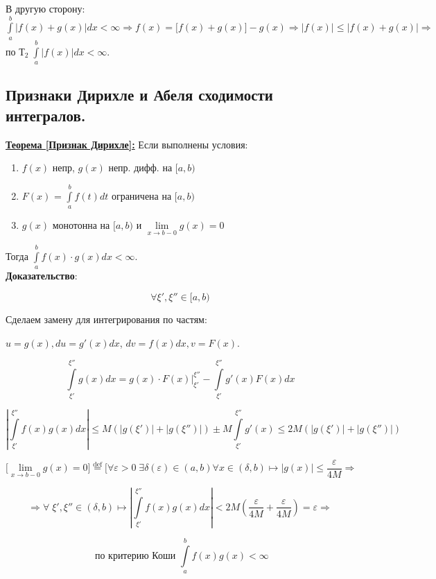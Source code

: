 \documentclass[a4paper,12pt]{article} %
\begin{document}
В другую сторону: $\int\limits_a^b |f(x) +g(x)| dx < \infty \Rightarrow f(x) = \bigl[f(x) + g(x) \bigr]-g(x) \Rightarrow |f(x)| \leq |f(x) + g(x)| \Rightarrow $ по $Т_2\; \int\limits_a^b |f(x)| dx < \infty$.\\


\subsection{Признаки Дирихле и Абеля сходимости интегралов.}

\underline{\textbf{Теорема [Признак Дирихле]:}} Если выполнены условия:

\begin{enumerate}
    \item $f(x)$ непр, $g(x)$ непр. дифф. на $[a, b)$
    
    \item $F(x)$ = $\int\limits_a^b f(t) dt$ ограничена на $[a, b)$
    
    \item $g(x)$ монотонна на $[a, b)$ и $\lim\limits_{x\rightarrow b-0}g(x) = 0$

\end{enumerate}

Тогда $\int\limits_a^b f(x)\cdot g(x) dx < \infty$.\\

\textbf{Доказательство}:

$$\forall \xi', \xi'' \in [a,b)$$

Сделаем замену для интегрирования по частям: 

$u = g(x), du=g'(x)dx$, $dv=f(x)dx, v=F(x)$.

$$\int\limits_{\xi'}^{\xi''} g(x) dx = g(x)\cdot F(x)\bigg|_{\xi'}^{\xi''} - \int\limits_{\xi'}^{\xi''} g'(x)F(x)dx$$ 

$$|\int\limits_{\xi'}^{\xi''} f(x)g(x)dx|\leq M(|g(\xi')|+|g(\xi'')|) \pm M \int\limits_{\xi'}^{\xi''} g'(x) \leq 2M(|g(\xi')|+|g(\xi'')|)$$

$$\bigl[ \lim\limits_{x\rightarrow b-0}g(x) = 0 \bigr] \stackrel{\text{def}}{=} \bigl[ \forall \varepsilon > 0 \; \exists \delta(\varepsilon) \in (a, b) \forall x\in (\delta, b) \longmapsto |g(x)| \leq \frac{\varepsilon}{4M}  \Rightarrow $$

$$  \Rightarrow \forall \; \xi', \xi'' \in (\delta, b) \longmapsto |\int\limits_{\xi'}^{\xi''} f(x)g(x)dx|<2M(\frac{\varepsilon}{4M}+\frac{\varepsilon}{4M}) = \varepsilon \Rightarrow $$

$$\text{ по критерию Коши } \int\limits_{a}^{b}f(x)g(x)<\infty$$\\\\
\end{document}
